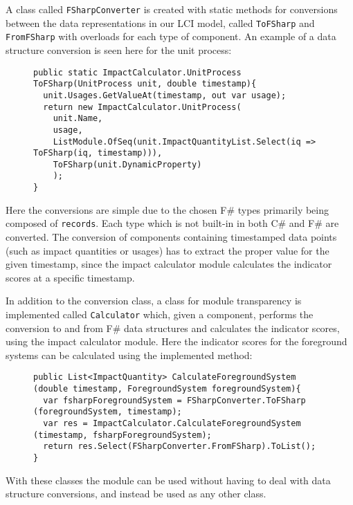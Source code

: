 \vspace{1 cm}
A class called \texttt{FSharpConverter} is created with static methods for conversions between the data representations in our LCI model, called \texttt{ToFSharp} and \texttt{FromFSharp} with overloads for each type of component. An example of a data structure conversion is seen here for the unit process:

\begin{figure}[H]
\begin{lstlisting}[language=CSharp]
public static ImpactCalculator.UnitProcess ToFSharp(UnitProcess unit, double timestamp){
  unit.Usages.GetValueAt(timestamp, out var usage);
  return new ImpactCalculator.UnitProcess(
    unit.Name, 
    usage, 
    ListModule.OfSeq(unit.ImpactQuantityList.Select(iq => ToFSharp(iq, timestamp))), 
    ToFSharp(unit.DynamicProperty)
    );
}
\end{lstlisting}
\end{figure}

Here the conversions are simple due to the chosen F\# types primarily being composed of \texttt{records}. Each type which is not built-in in both C\# and F\# are converted. The conversion of components containing timestamped data points (such as impact quantities or usages) has to extract the proper value for the given timestamp, since the impact calculator module calculates the indicator scores at a specific timestamp.

In addition to the conversion class, a class for module transparency is implemented called \texttt{Calculator} which, given a component, performs the conversion to and from F\# data structures and calculates the indicator scores, using the impact calculator module. Here the indicator scores for the foreground systems can be calculated using the implemented method: 

\begin{figure}[H]
\begin{lstlisting}[language=CSharp]
public List<ImpactQuantity> CalculateForegroundSystem (double timestamp, ForegroundSystem foregroundSystem){
  var fsharpForegroundSystem = FSharpConverter.ToFSharp (foregroundSystem, timestamp);
  var res = ImpactCalculator.CalculateForegroundSystem (timestamp, fsharpForegroundSystem);
  return res.Select(FSharpConverter.FromFSharp).ToList();
}
\end{lstlisting}
\end{figure}

With these classes the module can be used without having to deal with data structure conversions, and instead be used as any other class. 

